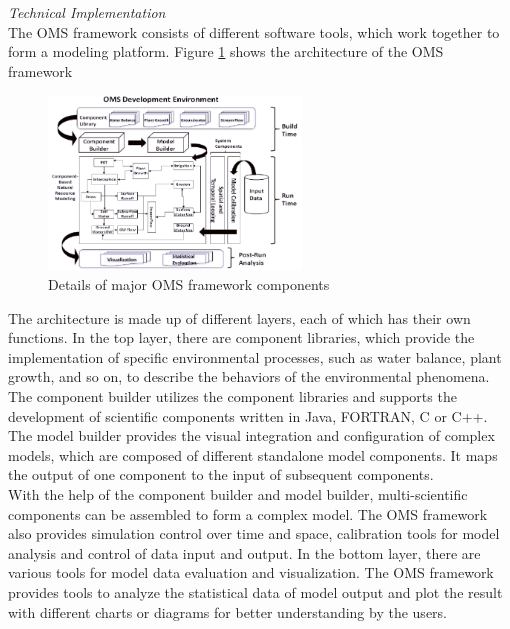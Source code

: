 \emph{Technical Implementation}\\
The OMS framework consists of different software tools, which work together to form a modeling platform. Figure \ref{fig:Details of major OMS framework components} shows the architecture of the OMS framework

\begin{figure}[htbp]
\centering
\includegraphics[width=0.6\textwidth]{pics/oms/Figure1.png}
\caption{Details of major OMS framework components}
\label{fig:Details of major OMS framework components}
\end{figure}

The architecture is made up of different layers, each of which has their own functions. In the top layer, there are component libraries, which provide the implementation of specific environmental processes, such as water balance, plant growth, and so on, to describe the behaviors of the environmental phenomena. The component builder utilizes the component libraries and supports the development of scientific components written in Java, FORTRAN, C or C++. The model builder provides the visual integration and configuration of complex models, which are composed of different standalone model components. It maps the output of one component to the input of subsequent components.\\
With the help of the component builder and model builder, multi-scientific components can be assembled to form a complex model. The OMS framework also provides simulation control over time and space, calibration tools for model analysis and control of data input and output. In the bottom layer, there are various tools for model data evaluation and visualization. The OMS framework provides tools to analyze the statistical data of model output and plot the result with different charts or diagrams for better understanding by the users.\\

